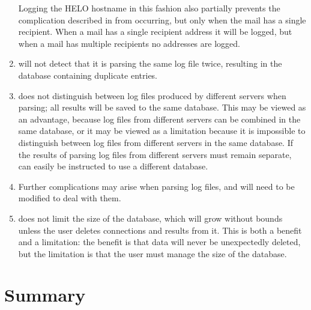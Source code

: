 \begin{enumerate}
        Logging the HELO hostname in this fashion also partially prevents
        the complication described in  from occurring, but only when the mail has a
        single recipient.  When a mail has a single recipient address it
        will be logged, but when a mail has multiple recipients no
        addresses are logged.

    \item \parsername{} will not detect that it is parsing the same log file
        twice, resulting in the database containing duplicate entries.

    \item \parsername{} does not distinguish between log files produced by
        different servers when parsing; all results will be saved to the
        same database.  This may be viewed as an advantage, because log
        files from different servers can be combined in the same database,
        or it may be viewed as a limitation because it is impossible to
        distinguish between log files from different servers in the same
        database.  If the results of parsing log files from different
        servers must remain separate, \parsername{} can easily be
        instructed to use a different database.

    \item Further complications may arise when parsing log files, and
        \parsername{} will need to be modified to deal with them.

    \item \parsername{} does not limit the size of the database, which will
        grow without bounds unless the user deletes connections and results
        from it.  This is both a benefit and a limitation: the benefit is
        that data will never be unexpectedly deleted, but the limitation is
        that the user must manage the size of the database.

\end{enumerate}


\section{Summary}

